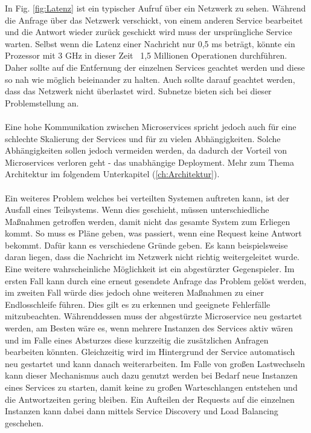 In Fig. \ref{fig:Latenz} ist ein typischer Aufruf über ein Netzwerk zu sehen. Während die Anfrage über das Netzwerk verschickt, von einem anderen Service bearbeitet und die Antwort wieder zurück geschickt wird muss der ursprüngliche Service warten. Selbst wenn die Latenz einer Nachricht nur 0,5 ms beträgt, könnte ein Prozessor mit 3 GHz in dieser Zeit ~1,5 Millionen Operationen durchführen. Daher sollte auf die Entfernung der einzelnen Services geachtet werden und diese so nah wie möglich beieinander zu halten. Auch sollte darauf geachtet werden, dass das Netzwerk nicht überlastet wird. Subnetze bieten sich bei dieser Problemstellung an. \paragraph{}
Eine hohe Kommunikation zwischen Microservices spricht jedoch auch für eine schlechte Skalierung der Services und für zu vielen Abhängigkeiten. Solche Abhängigkeiten sollen jedoch vermeiden werden, da dadurch der Vorteil von Microservices verloren geht - das unabhängige Deployment. Mehr zum Thema Architektur im folgendem Unterkapitel (\ref{ch:Architektur}). \paragraph{}
Ein weiteres Problem welches bei verteilten Systemen auftreten kann, ist der Ausfall eines Teilsystems. Wenn dies geschieht, müssen unterschiedliche Maßnahmen getroffen werden, damit nicht das gesamte System zum Erliegen kommt. So muss es Pläne geben, was passiert, wenn eine Request keine Antwort bekommt. Dafür kann es verschiedene Gründe geben. Es kann beispielsweise daran liegen, dass die Nachricht im Netzwerk nicht richtig weitergeleitet wurde. Eine weitere wahrscheinliche Möglichkeit ist ein abgestürzter Gegenspieler. Im ersten Fall kann durch eine erneut gesendete Anfrage das Problem gelöst werden, im zweiten Fall würde dies jedoch ohne weiteren Maßnahmen zu einer Endlosschleife führen. Dies gilt es zu erkennen und geeignete Fehlerfälle mitzubeachten. \newline
Währenddessen muss der abgestürzte Microservice neu gestartet werden, am Besten wäre es, wenn mehrere Instanzen des Services aktiv wären und im Falle eines Absturzes diese kurzzeitig die zusätzlichen Anfragen bearbeiten könnten. Gleichzeitig wird im Hintergrund der Service automatisch neu gestartet und kann danach weiterarbeiten. \newline
Im Falle von großen Lastwechseln kann dieser Mechanismus auch dazu genutzt werden bei Bedarf neue Instanzen eines Services zu starten, damit keine zu großen Warteschlangen entstehen und die Antwortzeiten gering bleiben. Ein Aufteilen der Requests auf die einzelnen Instanzen kann dabei dann mittels Service Discovery und Load Balancing geschehen.

